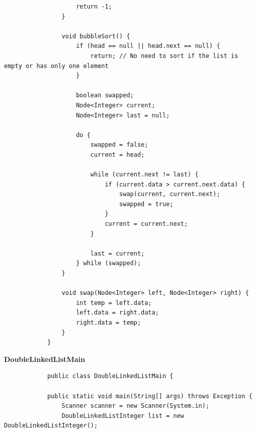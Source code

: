 \documentclass[12pt,titlepage]{article}
\begin{document}
\begin{enumerate}
{\begin{verbatim}
                    return -1;
                }

                void bubbleSort() {
                    if (head == null || head.next == null) {
                        return; // No need to sort if the list is empty or has only one element
                    }

                    boolean swapped;
                    Node<Integer> current;
                    Node<Integer> last = null;

                    do {
                        swapped = false;
                        current = head;

                        while (current.next != last) {
                            if (current.data > current.next.data) {
                                swap(current, current.next);
                                swapped = true;
                            }
                            current = current.next;
                        }

                        last = current;
                    } while (swapped);
                }

                void swap(Node<Integer> left, Node<Integer> right) {
                    int temp = left.data;
                    left.data = right.data;
                    right.data = temp;
                }
            }
        \end{verbatim}

        \large{\textbf{DoubleLinkedListMain}}
        \begin{verbatim}
            public class DoubleLinkedListMain {

            public static void main(String[] args) throws Exception {
                Scanner scanner = new Scanner(System.in);
                DoubleLinkedListInteger list = new DoubleLinkedListInteger();


\end{verbatim}}
\end{enumerate}
\end{document}
